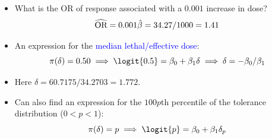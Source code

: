 \documentclass[oneside]{book}\usepackage[]{graphicx}\usepackage[svgnames]{xcolor}
\let\exp\relax%
\begin{document}
\begin{itemize}
    \item What is the OR of response associated with a $ 0.001 $ increase in dose?
          \[ \widehat{\text{OR}}=\exp{0.001\hat{\beta}}=\exp{34.27/1000}=1.41 \]
    \item An expression for the \textcolor{Blue}{median lethal/effective dose}:
          \[ \pi(\delta)=0.50\implies\logit{0.5}=\beta_0+\beta_1\delta\implies \delta=-\beta_0/\beta_1 \]
    \item Here $ \hat{\delta}=60.7175/34.2703=1.772 $.
    \item Can also find an expression for the $ 100p $th percentile of the tolerance distribution ($ 0<p<1 $):
          \[ \pi(\delta)=p\implies\logit{p}=\beta_0+\beta_1\delta_p \]
\end{itemize}
\end{document}
